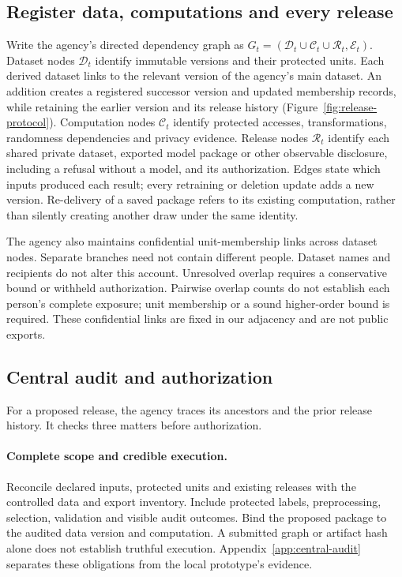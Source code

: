 \subsection{Register data, computations and every release}
\label{sec:central-graph}
Write the agency's directed dependency graph as
$G_t=(\mathcal D_t\cup\mathcal C_t\cup\mathcal R_t,\mathcal E_t)$.
Dataset nodes $\mathcal D_t$ identify immutable versions and their
protected units. Each derived dataset links to the relevant version of
the agency's main dataset. An addition creates a registered successor
version and updated membership records, while retaining the earlier
version and its release history (Figure~\ref{fig:release-protocol}).
Computation nodes $\mathcal C_t$ identify protected
accesses, transformations, randomness dependencies and privacy evidence.
Release nodes $\mathcal R_t$ identify each shared private dataset,
exported model package or other observable disclosure, including a
refusal without a model, and
its authorization. Edges state which inputs produced each result;
every retraining or deletion update adds a new version. Re-delivery of
a saved package refers to its existing computation, rather than silently
creating another draw under the same identity.

The agency also maintains confidential unit-membership links across
dataset nodes. Separate branches need not contain different people.
Dataset names and recipients do not alter this account. Unresolved
overlap requires a conservative bound or withheld authorization. Pairwise
overlap counts do not establish each person's complete exposure; unit
membership or a sound higher-order bound is required. These confidential
links are fixed in our adjacency and are not public exports.

\subsection{Central audit and authorization}
\label{sec:central-audit}
For a proposed release, the agency traces its ancestors and the prior
release history. It checks three matters before authorization.

\paragraph{Complete scope and credible execution.}
Reconcile declared inputs, protected units and existing releases with
the controlled data and export inventory. Include protected labels,
preprocessing, selection, validation and visible audit outcomes.
Bind the proposed package to the audited data version and computation.
A submitted graph or artifact hash alone does not establish truthful
execution. Appendix~\ref{app:central-audit} separates these obligations
from the local prototype's evidence.

